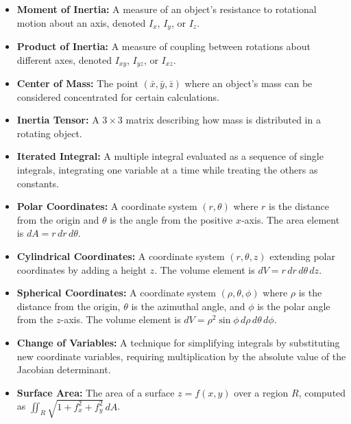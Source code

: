 \begin{itemize}
\item \textbf{Moment of Inertia:} A measure of an object's resistance to rotational motion about an axis, denoted \(I_x\), \(I_y\), or \(I_z\).

\item \textbf{Product of Inertia:} A measure of coupling between rotations about different axes, denoted \(I_{xy}\), \(I_{yz}\), or \(I_{xz}\).

\item \textbf{Center of Mass:} The point \((\bar{x}, \bar{y}, \bar{z})\) where an object's mass can be considered concentrated for certain calculations.

\item \textbf{Inertia Tensor:} A \(3\times3\) matrix describing how mass is distributed in a rotating object.

\item \textbf{Iterated Integral:} A multiple integral evaluated as a sequence of single integrals, integrating one variable at a time while treating the others as constants.

\item \textbf{Polar Coordinates:} A coordinate system \( (r, \theta) \) where \( r \) is the distance from the origin and \( \theta \) is the angle from the positive \( x \)-axis. The area element is \( dA = r \, dr \, d\theta \).

\item \textbf{Cylindrical Coordinates:} A coordinate system \( (r, \theta, z) \) extending polar coordinates by adding a height \( z \). The volume element is \( dV = r \, dr \, d\theta \, dz \).

\item \textbf{Spherical Coordinates:} A coordinate system \( (\rho, \theta, \phi) \) where \( \rho \) is the distance from the origin, \( \theta \) is the azimuthal angle, and \( \phi \) is the polar angle from the \( z \)-axis. The volume element is \( dV = \rho^2 \sin\phi \, d\rho \, d\theta \, d\phi \).

\item \textbf{Change of Variables:} A technique for simplifying integrals by substituting new coordinate variables, requiring multiplication by the absolute value of the Jacobian determinant.

\item \textbf{Surface Area:} The area of a surface \( z = f(x,y) \) over a region \( R \), computed as \( \iint_R \sqrt{1 + f_x^2 + f_y^2} \, dA \).
\end{itemize}

